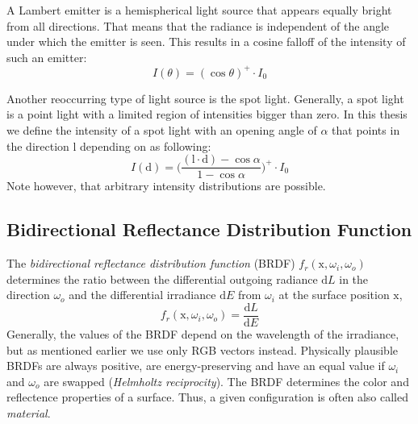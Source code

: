 \documentclass[thesis.tex]{subfiles}
\begin{document}
A Lambert emitter is a hemispherical light source that appears equally bright from all directions.
That means that the radiance is independent of the angle under which the emitter is seen.
This results in a cosine falloff of the intensity of such an emitter:
\begin{equation}
I(\theta) = (\cos\theta)^+ \cdot I_0
\end{equation}

Another reoccurring type of light source is the spot light.
Generally, a spot light is a point light with a limited region of intensities bigger than zero.
In this thesis we define the intensity of a spot light with an opening angle of $\alpha$ that points in the direction $\mathrm{l}$ depending on as following:
\begin{equation}
I(\mathrm{d}) = \Big(\frac{(\mathrm{l} \cdot \mathrm{d}) - \cos\alpha }{1-\cos\alpha}\Big)^+ \cdot I_0
\end{equation}
Note however, that arbitrary intensity distributions are possible.


\subsection{Bidirectional Reflectance Distribution Function}\label{sec:preq:brdf}
The \emph{bidirectional reflectance distribution function} (BRDF) $f_r(\mathrm{x}, \omega_i, \omega_o)$ determines the ratio between the differential outgoing radiance $\mathrm{d}L$ in the direction $\omega_o$ and the differential irradiance $\mathrm{d}E$ from $\omega_i$ at the surface position $\mathrm{x}$,
\begin{equation}
f_r(\mathrm{x}, \omega_i, \omega_o) = \frac{\mathrm{d}L}{\mathrm{d}E}
\end{equation}
Generally, the values of the BRDF depend on the wavelength of the irradiance, but as mentioned earlier we use only RGB vectors instead.
Physically plausible BRDFs are always positive, are energy-preserving and have an equal value if $\omega_i$ and $\omega_o$ are swapped (\emph{Helmholtz reciprocity}).
The BRDF determines the color and reflectence properties of a surface.
Thus, a given configuration is often also called \emph{material}.
\end{document}
